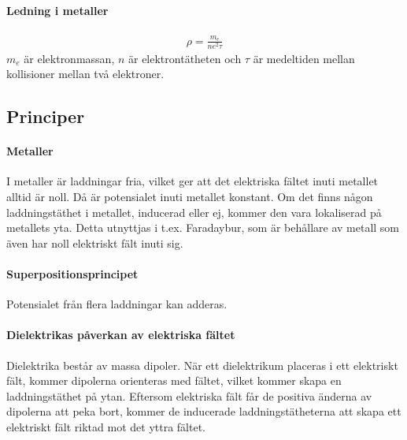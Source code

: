 \deriv

\paragraph{Ledning i metaller}
\begin{align*}
	\rho = \frac{m_e}{ne^2\tau}
\end{align*}
$m_e$ är elektronmassan, $n$ är elektrontätheten och $\tau$ är medeltiden mellan kollisioner mellan två elektroner.

\subsection{Principer}

\paragraph{Metaller}
I metaller är laddningar fria, vilket ger att det elektriska fältet inuti metallet alltid är noll. Då är potensialet inuti metallet konstant. Om det finns någon laddningstäthet i metallet, inducerad eller ej, kommer den vara lokaliserad på metallets yta. Detta utnyttjas i t.ex. Faradaybur, som är behållare av metall som även har noll elektriskt fält inuti sig.

\paragraph{Superpositionsprincipet}
Potensialet från flera laddningar kan adderas.

\paragraph{Dielektrikas påverkan av elektriska fältet}
Dielektrika består av massa dipoler. När ett dielektrikum placeras i ett elektriskt fält, kommer dipolerna orienteras med fältet, vilket kommer skapa en laddningstäthet på ytan. Eftersom elektriska fält får de positiva änderna av dipolerna att peka bort, kommer de inducerade laddningstätheterna att skapa ett elektriskt fält riktad mot det yttra fältet.
